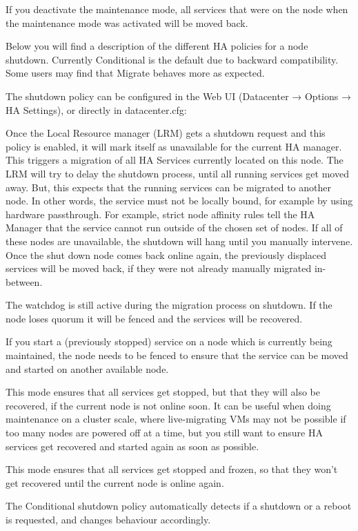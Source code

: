 If you deactivate the maintenance mode, all services that were on the node when the maintenance mode was activated will be moved back.

Below you will find a description of the different HA policies for a node shutdown. Currently Conditional is the default due to backward compatibility. Some users may find that Migrate behaves more as expected.

The shutdown policy can be configured in the Web UI (Datacenter → Options → HA Settings), or directly in datacenter.cfg:

Once the Local Resource manager (LRM) gets a shutdown request and this policy is enabled, it will mark itself as unavailable for the current HA manager. This triggers a migration of all HA Services currently located on this node. The LRM will try to delay the shutdown process, until all running services get moved away. But, this expects that the running services can be migrated to another node. In other words, the service must not be locally bound, for example by using hardware passthrough. For example, strict node affinity rules tell the HA Manager that the service cannot run outside of the chosen set of nodes. If all of these nodes are unavailable, the shutdown will hang until you manually intervene. Once the shut down node comes back online again, the previously displaced services will be moved back, if they were not already manually migrated in-between.

The watchdog is still active during the migration process on shutdown. If the node loses quorum it will be fenced and the services will be recovered.

If you start a (previously stopped) service on a node which is currently being maintained, the node needs to be fenced to ensure that the service can be moved and started on another available node.

This mode ensures that all services get stopped, but that they will also be recovered, if the current node is not online soon. It can be useful when doing maintenance on a cluster scale, where live-migrating VMs may not be possible if too many nodes are powered off at a time, but you still want to ensure HA services get recovered and started again as soon as possible.

This mode ensures that all services get stopped and frozen, so that they won’t get recovered until the current node is online again.

The Conditional shutdown policy automatically detects if a shutdown or a reboot is requested, and changes behaviour accordingly.

